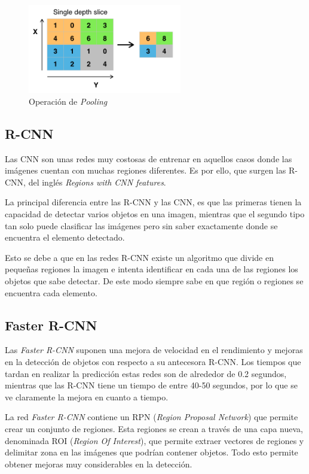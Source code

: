 \begin{figure}[h]
 \centering
  \includegraphics[width=0.6\textwidth]{img/pooling.png}
 \caption{Operación de \emph{Pooling} \cite{wiki:pooling}}
 \label{f:pooling}
\end{figure}

\subsection{R-CNN}
Las CNN son unas redes muy costosas de entrenar en aquellos casos donde las imágenes cuentan con muchas regiones diferentes. Es por ello, que surgen las R-CNN, del inglés \emph{Regions with CNN features}.

La principal diferencia entre las R-CNN y las CNN, es que las primeras tienen la capacidad de detectar varios objetos en una imagen, mientras que el segundo tipo tan solo puede clasificar las imágenes pero sin saber exactamente donde se encuentra el elemento detectado. 

Esto se debe a que en las redes R-CNN existe un algoritmo que divide en pequeñas regiones la imagen e intenta identificar en cada una de las regiones los objetos que sabe detectar. De este modo siempre sabe en que región o regiones se encuentra cada elemento.

\subsection{Faster R-CNN}
Las \emph{Faster R-CNN} suponen una mejora de velocidad en el rendimiento y mejoras en la detección de objetos con respecto a su antecesora R-CNN. Los tiempos que tardan en realizar la predicción estas redes son de alrededor de 0.2 segundos, mientras que las R-CNN tiene un tiempo de entre 40-50 segundos, por lo que se ve claramente la mejora en cuanto a tiempo.

La red \emph{Faster R-CNN} contiene un RPN (\emph{Region Proposal Network}) que permite crear un conjunto de regiones. Esta regiones se crean a través de una capa nueva, denominada ROI (\emph{Region Of Interest}), que permite extraer vectores de regiones y delimitar zona en las imágenes que podrían contener objetos. Todo esto permite obtener mejoras muy considerables en la detección. 

